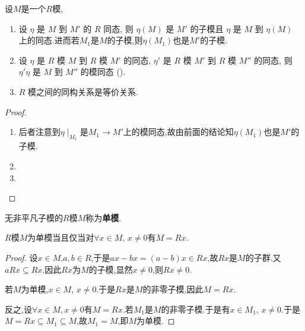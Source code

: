 \documentclass[../../main.tex]{subfiles}%
\begin{document}
\begin{theorem}\label{theorem:摸同态的基本性质}
设$M$是一个$R$模,
\begin{enumerate}[(1)]
\item\label{theorem:摸同态的基本性质-1} 设 \( \eta \) 是 \( M \) 到 \( M' \) 的 \( R \) 同态, 则 \( \eta(M) \) 是 \( M' \) 的子模且 \( \eta \) 是 \( M \) 到 \( \eta(M) \) 上的同态.进而若$M_1$是$M$的子模,则$\eta(M_1)$也是$M'$的子模.

\item 设 \( \eta \) 是 \( R \) 模 \( M \) 到 \( R \) 模 \( M' \) 的同态, \( \eta' \) 是 \( R \) 模 \( M' \) 到 \( R \) 模 \( M'' \) 的同态, 则 \( \eta'\eta \) 是 \( M \) 到 \( M'' \) 的模同态 ().

\item \( R \) 模之间的同构关系是等价关系.
\end{enumerate}
\end{theorem}
\begin{figure}[H]
\centering
\caption{}
\label{figure:交换图3}
\end{figure}
\begin{proof}
\begin{enumerate}[(1)]
\item 后者注意到$\eta\mid_{M_1}$是$M_1\to M'$上的模同态,故由前面的结论知$\eta(M_1)$也是$M'$的子模.

\item 

\item 
\end{enumerate}

\end{proof}

\begin{definition}[单模]
无非平凡子模的$R$模$M$称为\textbf{单模}.
\end{definition}

\begin{theorem}
$R$模$M$为单模当且仅当对$\forall x\in M,\,x\neq 0$有$M=Rx$.
\end{theorem}
\begin{proof}

设$x\in M$,$a,b\in R$,于是$ax-bx=(a-b)x\in Rx$,故$Rx$是$M$的子群.又 $aRx\subseteq Rx$.因此$Rx$为$M$的子模,显然$x\neq 0$,则$Rx\neq 0$.

若$M$为单模,$x\in M,\,x\neq 0$.于是$Rx$是$M$的非零子模,因此$M=Rx$.

反之,设$\forall x\in M,x\neq 0$有$M=Rx$.若$M_1$是$M$的非零子模.于是有$x\in M_1$, $x\neq 0$.于是$M=Rx\subseteq M_1\subseteq M$,故$M_1=M$,即$M$为单模.

\end{proof}
\end{document}
